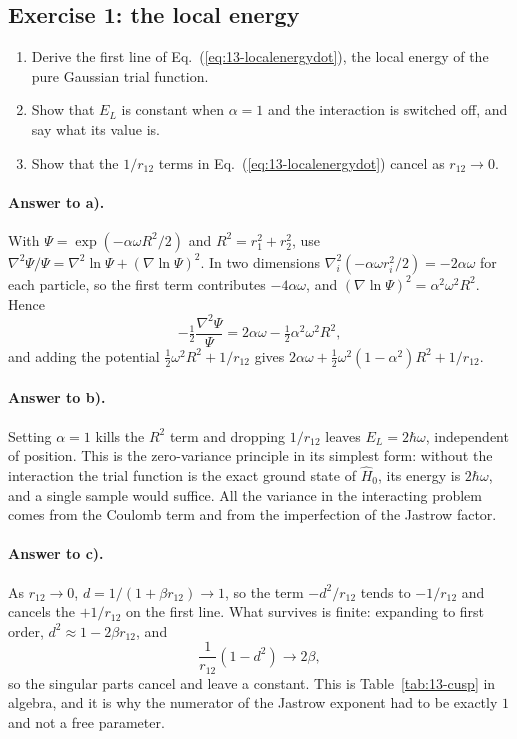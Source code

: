 \subsection*{Exercise 1: the local energy}
\label{ex:13-localenergy}

\begin{enumerate}
  \item[a)] Derive the first line of Eq.~(\ref{eq:13-localenergydot}), the
  local energy of the pure Gaussian trial function.
  \item[b)] Show that $E_L$ is constant when $\alpha=1$ and the interaction is
  switched off, and say what its value is.
  \item[c)] Show that the $1/r_{12}$ terms in
  Eq.~(\ref{eq:13-localenergydot}) cancel as $r_{12}\to0$.
\end{enumerate}

\paragraph{Answer to a).}
With $\Psi=\exp(-\alpha\omega R^2/2)$ and $R^2=r_1^2+r_2^2$, use
$\nabla^2\Psi/\Psi = \nabla^2\ln\Psi + (\nabla\ln\Psi)^2$.  In two dimensions
$\nabla_i^2(-\alpha\omega r_i^2/2)=-2\alpha\omega$ for each particle, so the
first term contributes $-4\alpha\omega$, and
$(\nabla\ln\Psi)^2=\alpha^2\omega^2R^2$.  Hence
\[
  -\tfrac12\frac{\nabla^2\Psi}{\Psi}
   = 2\alpha\omega - \tfrac12\alpha^2\omega^2R^2 ,
\]
and adding the potential $\tfrac12\omega^2R^2 + 1/r_{12}$ gives
$2\alpha\omega + \tfrac12\omega^2(1-\alpha^2)R^2 + 1/r_{12}$.

\paragraph{Answer to b).}
Setting $\alpha=1$ kills the $R^2$ term and dropping $1/r_{12}$ leaves
$E_L=2\hbar\omega$, independent of position.  This is the zero-variance
principle in its simplest form: without the interaction the trial function is
the exact ground state of $\hat{H}_0$, its energy is $2\hbar\omega$, and a
single sample would suffice.  All the variance in the interacting problem
comes from the Coulomb term and from the imperfection of the Jastrow factor.

\paragraph{Answer to c).}
As $r_{12}\to0$, $d=1/(1+\beta r_{12})\to1$, so the term $-d^2/r_{12}$ tends
to $-1/r_{12}$ and cancels the $+1/r_{12}$ on the first line.  What survives
is finite: expanding to first order, $d^2\approx1-2\beta r_{12}$, and
\[
  \frac{1}{r_{12}}\left(1-d^2\right) \longrightarrow 2\beta ,
\]
so the singular parts cancel and leave a constant.  This is
Table~\ref{tab:13-cusp} in algebra, and it is why the numerator of the Jastrow
exponent had to be exactly $1$ and not a free parameter.

